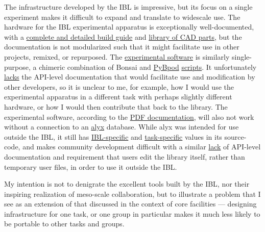 \documentclass[10pt]{tufte-book}
\begin{document}
The infrastructure developed by the IBL is impressive, but its focus on
a single experiment makes it difficult to expand and translate to
widescale use. The hardware for the IBL experimental apparatus is
exceptionally well-documented, with a
\href{https://figshare.com/articles/preprint/A_standardized_and_reproducible_method_to_measure_decision-making_in_mice_Appendix_3_IBL_protocol_for_setting_up_the_behavioral_training_rig/11634732}{complete
and detailed build guide} and
\href{https://figshare.com/articles/online_resource/A_standardized_and_reproducible_method_to_measure_decision-making_in_mice_CAD_files_for_behavior_rig/11639973}{library
of CAD parts}, but the documentation is not modularized such that it
might facilitate use in other projects, remixed, or repurposed. The
\href{https://github.com/int-brain-lab/iblrig}{experimental software} is
similarly single-purpose, a chimeric combination of Bonsai \citep{lopesBonsaiEventbasedFramework2015}  and
\href{https://github.com/pybpod/pybpod}{PyBpod}
\href{https://github.com/int-brain-lab/iblrig/tree/master/tasks/_iblrig_tasks_ephysChoiceWorld}{scripts}.
It unfortunately
\href{https://iblrig.readthedocs.io/en/latest/index.html}{lacks} the
API-level documentation that would facilitate use and modification by
other developers, so it is unclear to me, for example, how I would use
the experimental apparatus in a different task with perhaps slightly
different hardware, or how I would then contribute that back to the
library. The experimental software, according to the
\href{https://figshare.com/articles/preprint/A_standardized_and_reproducible_method_to_measure_decision-making_in_mice_Appendix_3_IBL_protocol_for_setting_up_the_behavioral_training_rig/11634732}{PDF
documentation}, will also not work without a connection to an
\href{https://github.com/cortex-lab/alyx}{alyx} database. While alyx was
intended for use outside the IBL, it still has
\href{https://github.com/cortex-lab/alyx/blob/07f481f6bbde668b81ad2634f4c42df4d6a74e44/alyx/data/management/commands/files.py\#L188}{IBL-specific}
and
\href{https://github.com/cortex-lab/alyx/blob/07f481f6bbde668b81ad2634f4c42df4d6a74e44/alyx/data/fixtures/data.datasettype.json\#L29}{task-specific}
values in its source-code, and makes community development difficult
with a similar \href{https://alyx.readthedocs.io/en/latest/}{lack} of
API-level documentation and requirement that users edit the library
itself, rather than temporary user files, in order to use it outside the
IBL.

My intention is not to denigrate the excellent tools built by the IBL,
nor their inspiring realization of meso-scale collaboration, but to
illustrate a problem that I see as an extension of that discussed in the
context of core facilities --- designing infrastructure for one task, or
one group in particular makes it much less likely to be portable to
other tasks and groups.
\end{document}
